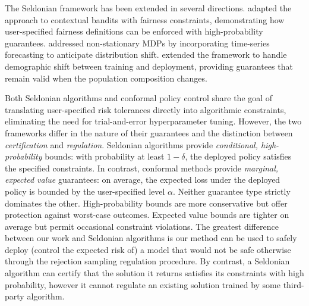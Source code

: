 The Seldonian framework has been extended in several directions.
\citet{metevier2019offline} adapted the approach to contextual bandits with fairness constraints, demonstrating how user-specified fairness definitions can be enforced with high-probability guarantees.
\citet{chandak2020towards} addressed non-stationary MDPs by incorporating time-series forecasting to anticipate distribution shift.
\citet{giguere2022fairness} extended the framework to handle demographic shift between training and deployment, providing guarantees that remain valid when the population composition changes.

Both Seldonian algorithms and conformal policy control share the goal of translating user-specified risk tolerances directly into algorithmic constraints, eliminating the need for trial-and-error hyperparameter tuning.
However, the two frameworks differ in the nature of their guarantees and the distinction between \textit{certification} and \textit{regulation}.
Seldonian algorithms provide \textit{conditional, high-probability} bounds: with probability at least $1 - \delta$, the deployed policy satisfies the specified constraints.
In contrast, conformal methods provide \textit{marginal, expected value} guarantees: on average, the expected loss under the deployed policy is bounded by the user-specified level $\alpha$.
Neither guarantee type strictly dominates the other. High-probability bounds are more conservative but offer protection against worst-case outcomes. Expected value bounds are tighter on average but permit occasional constraint violations.
The greatest difference between our work and Seldonian algorithms is our method can be used to safely deploy (control the expected risk of) a model that would not be safe otherwise through the rejection sampling regulation procedure. 
By contrast, a Seldonian algorithm can certify that the solution it returns satisfies its constraints with high probability, however it cannot regulate an existing solution trained by some third-party algorithm.

\clearpage